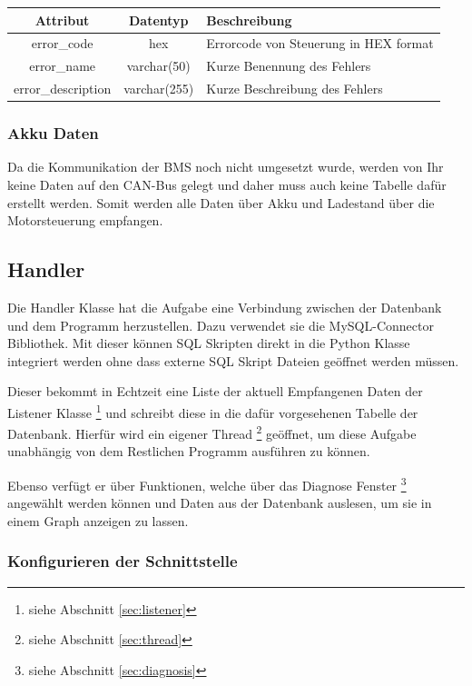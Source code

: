 \begin{table}[H]
	\begin{tabular}{|c|c|l|}
		\hline
		\textbf{Attribut}  & \textbf{Datentyp} & \textbf{Beschreibung}                 \\ \hline
		error\_code        & hex               & Errorcode von Steuerung in HEX format \\ \hline
		error\_name        & varchar(50)       & Kurze Benennung des Fehlers           \\ \hline
		error\_description & varchar(255)      & Kurze Beschreibung des Fehlers        \\ \hline
	\end{tabular}
\end{table}

\subsubsection{Akku Daten}

Da die Kommunikation der BMS noch nicht umgesetzt wurde, werden von Ihr keine Daten auf den CAN-Bus gelegt und daher muss auch keine Tabelle dafür erstellt werden. Somit werden alle Daten über Akku und Ladestand über die Motorsteuerung empfangen.

\subsection{Handler} \label{sec:handler}

Die Handler Klasse hat die Aufgabe eine Verbindung zwischen der Datenbank und dem Programm herzustellen. Dazu verwendet sie die MySQL-Connector Bibliothek. Mit dieser können SQL Skripten direkt in die Python Klasse integriert werden ohne dass externe SQL Skript Dateien geöffnet werden müssen.

Dieser bekommt in Echtzeit eine Liste der aktuell Empfangenen Daten der Listener Klasse \footnote{siehe Abschnitt \ref{sec:listener}} und schreibt diese in die dafür vorgesehenen Tabelle der Datenbank. Hierfür wird ein eigener Thread \footnote{siehe Abschnitt \ref{sec:thread}} geöffnet, um diese Aufgabe unabhängig von dem Restlichen Programm ausführen zu können.

Ebenso verfügt er über Funktionen, welche über das Diagnose Fenster \footnote{siehe Abschnitt \ref{sec:diagnosis} } angewählt werden können und Daten aus der Datenbank auslesen, um sie in einem Graph anzeigen zu lassen.

\subsubsection{Konfigurieren der Schnittstelle}

